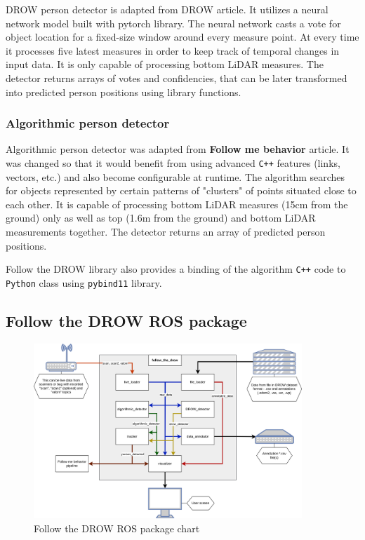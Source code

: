 \documentclass{article}
\begin{document}
DROW person detector is adapted from DROW\cite{DROW_2018} article.
It utilizes a neural network model built with pytorch\cite{pytorch_site} library.
The neural network casts a vote for object location for a fixed-size window around every measure point.
At every time it processes five latest measures in order to keep track of temporal changes in input data.
It is only capable of processing bottom LiDAR measures.
The detector returns arrays of votes and confidencies, that can be later transformed into predicted person positions using library functions.

\subsubsection{Algorithmic person detector}

Algorithmic person detector was adapted from \textbf{Follow me behavior} \cite{follow_me_behavior} article.
It was changed so that it would benefit from using advanced \texttt{C++} features (links, vectors, etc.) and also become configurable at runtime.
The algorithm searches for objects represented by certain patterns of "clusters" of points situated close to each other.
It is capable of processing bottom LiDAR measures (15cm from the ground) only as well as top (1.6m from the ground) and bottom LiDAR measurements together.
The detector returns an array of predicted person positions.

Follow the DROW library also provides a binding of the algorithm \texttt{C++} code to \texttt{Python} class using \texttt{pybind11}\cite{pybind_site} library.

\subsection{Follow the DROW ROS package}

\begin{figure}[t!]
	\centering
	\includegraphics[width=0.9\textwidth]{ftd_package_chart}
	\caption{Follow the DROW ROS package chart}
	\label{fig:ftd_package_chart}
\end{figure}
\end{document}
